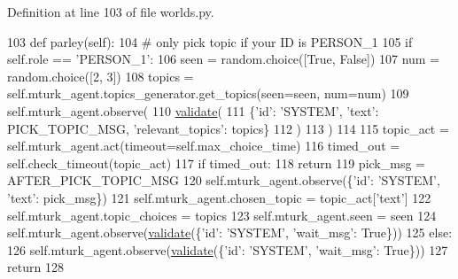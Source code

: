 Definition at line 103 of file worlds.\+py.


\begin{DoxyCode}
103     \textcolor{keyword}{def }parley(self):
104         \textcolor{comment}{# only pick topic if your ID is PERSON\_1}
105         \textcolor{keywordflow}{if} self.role == \textcolor{stringliteral}{'PERSON\_1'}:
106             seen = random.choice([\textcolor{keyword}{True}, \textcolor{keyword}{False}])
107             num = random.choice([2, 3])
108             topics = self.mturk\_agent.topics\_generator.get\_topics(seen=seen, num=num)
109             self.mturk\_agent.observe(
110                 \hyperlink{namespaceparlai_1_1core_1_1worlds_afc3fad603b7bce41dbdc9cdc04a9c794}{validate}(
111                     \{\textcolor{stringliteral}{'id'}: \textcolor{stringliteral}{'SYSTEM'}, \textcolor{stringliteral}{'text'}: PICK\_TOPIC\_MSG, \textcolor{stringliteral}{'relevant\_topics'}: topics\}
112                 )
113             )
114 
115             topic\_act = self.mturk\_agent.act(timeout=self.max\_choice\_time)
116             timed\_out = self.check\_timeout(topic\_act)
117             \textcolor{keywordflow}{if} timed\_out:
118                 \textcolor{keywordflow}{return}
119             pick\_msg = AFTER\_PICK\_TOPIC\_MSG
120             self.mturk\_agent.observe(\{\textcolor{stringliteral}{'id'}: \textcolor{stringliteral}{'SYSTEM'}, \textcolor{stringliteral}{'text'}: pick\_msg\})
121             self.mturk\_agent.chosen\_topic = topic\_act[\textcolor{stringliteral}{'text'}]
122             self.mturk\_agent.topic\_choices = topics
123             self.mturk\_agent.seen = seen
124             self.mturk\_agent.observe(\hyperlink{namespaceparlai_1_1core_1_1worlds_afc3fad603b7bce41dbdc9cdc04a9c794}{validate}(\{\textcolor{stringliteral}{'id'}: \textcolor{stringliteral}{'SYSTEM'}, \textcolor{stringliteral}{'wait\_msg'}: \textcolor{keyword}{True}\}))
125         \textcolor{keywordflow}{else}:
126             self.mturk\_agent.observe(\hyperlink{namespaceparlai_1_1core_1_1worlds_afc3fad603b7bce41dbdc9cdc04a9c794}{validate}(\{\textcolor{stringliteral}{'id'}: \textcolor{stringliteral}{'SYSTEM'}, \textcolor{stringliteral}{'wait\_msg'}: \textcolor{keyword}{True}\}))
127         \textcolor{keywordflow}{return}
128 
\end{DoxyCode}


